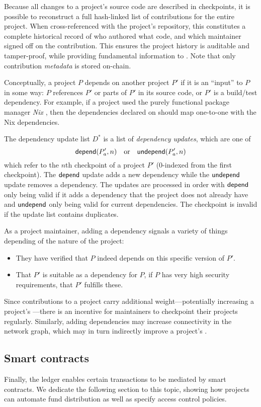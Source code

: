 Because all changes to a project's source code are described in checkpoints, it
is possible to reconstruct a full hash-linked list of contributions for the
entire project. When cross-referenced with the project's repository, this
constitutes a complete historical record of who authored what code, and which
maintainer signed off on the contribution. This ensures the project history is
auditable and tamper-proof, while providing fundamental information to
\osrank{}. Note that only contribution \emph{metadata} is stored
on-chain.

\label{s:dependencies}
Conceptually, a project $P$ depends on another project $P'$ if it is an
``input'' to $P$ in some way: $P$ references $P'$ or parts of $P'$ in its
source code, or $P'$ is a build/test dependency.  For example, if a project
used the purely functional package manager \emph{Nix} \cite{nix}, then the
dependencies declared on \oscoin{} should map one-to-one with the Nix
dependencies.

The dependency update list $D^*$ is a list of \emph{dependency
  updates}, which are one of
\[
    \mathsf{depend}(P'_a, n) \quad \text{or} \quad \mathsf{undepend}(P'_a, n)
\]
which refer to the $n$th checkpoint of a project $P'$ ($0$-indexed
from the first checkpoint). The $\mathsf{depend}$ update adds a new dependency
while the $\mathsf{undepend}$ update removes a dependency. The updates are
processed in order with $\mathsf{depend}$ only being valid if it adds a
dependency that the project does not already have and $\mathsf{undepend}$
only being valid for current dependencies. The checkpoint is invalid
if the update list contains duplicates.

As a project maintainer, adding a dependency signals a variety of things
depending of the nature of the project:
\begin{itemize}
\item They have verified that $P$ indeed depends on this specific
  version of $P'$.
\item That $P'$ is suitable as a dependency for $P$, \eg{} if $P$ has
  very high security requirements, that $P'$ fulfills these.
\end{itemize}
\noindent Since contributions to a project carry additional
weight---potentially increasing a project's \osrank{}---there is an incentive
for maintainers to checkpoint their projects regularly.  Similarly, adding
dependencies may increase connectivity in the network graph, which may in turn
indirectly improve a project's \osrank{}.

\subsection{Smart contracts}

Finally, the ledger enables certain transactions to be mediated by smart contracts.
We dedicate the following section to this topic, showing how projects can automate
fund distribution as well as specify access control policies.

